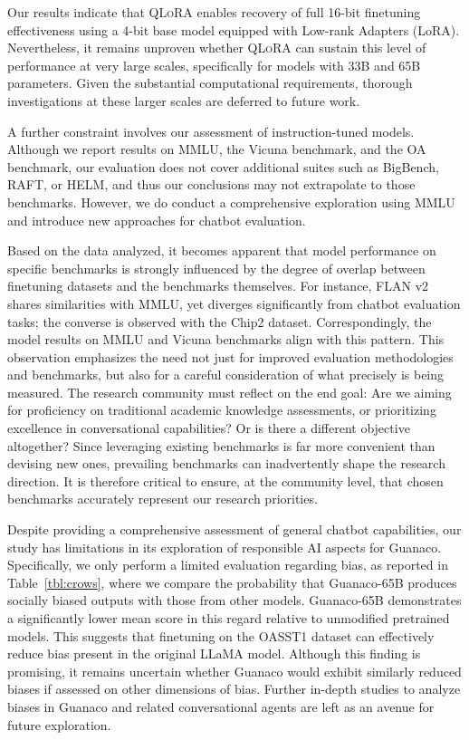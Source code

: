 Our results indicate that \textsc{QLoRA} enables recovery of full 16-bit finetuning effectiveness using a 4-bit base model equipped with Low-rank Adapters (LoRA). Nevertheless, it remains unproven whether \textsc{QLoRA} can sustain this level of performance at very large scales, specifically for models with 33B and 65B parameters. Given the substantial computational requirements, thorough investigations at these larger scales are deferred to future work.

A further constraint involves our assessment of instruction-tuned models. Although we report results on MMLU, the Vicuna benchmark, and the OA benchmark, our evaluation does not cover additional suites such as BigBench, RAFT, or HELM, and thus our conclusions may not extrapolate to those benchmarks. However, we do conduct a comprehensive exploration using MMLU and introduce new approaches for chatbot evaluation.

Based on the data analyzed, it becomes apparent that model performance on specific benchmarks is strongly influenced by the degree of overlap between finetuning datasets and the benchmarks themselves. For instance, FLAN v2 shares similarities with MMLU, yet diverges significantly from chatbot evaluation tasks; the converse is observed with the Chip2 dataset. Correspondingly, the model results on MMLU and Vicuna benchmarks align with this pattern. This observation emphasizes the need not just for improved evaluation methodologies and benchmarks, but also for a careful consideration of what precisely is being measured. The research community must reflect on the end goal: Are we aiming for proficiency on traditional academic knowledge assessments, or prioritizing excellence in conversational capabilities? Or is there a different objective altogether? Since leveraging existing benchmarks is far more convenient than devising new ones, prevailing benchmarks can inadvertently shape the research direction. It is therefore critical to ensure, at the community level, that chosen benchmarks accurately represent our research priorities.

Despite providing a comprehensive assessment of general chatbot capabilities, our study has limitations in its exploration of responsible AI aspects for {Guanaco}. Specifically, we only perform a limited evaluation regarding bias, as reported in Table~\ref{tbl:crows}, where we compare the probability that {Guanaco}-65B produces socially biased outputs with those from other models. {Guanaco}-65B demonstrates a significantly lower mean score in this regard relative to unmodified pretrained models. This suggests that finetuning on the OASST1 dataset can effectively reduce bias present in the original LLaMA model. Although this finding is promising, it remains uncertain whether {Guanaco} would exhibit similarly reduced biases if assessed on other dimensions of bias. Further in-depth studies to analyze biases in {Guanaco} and related conversational agents are left as an avenue for future exploration.

